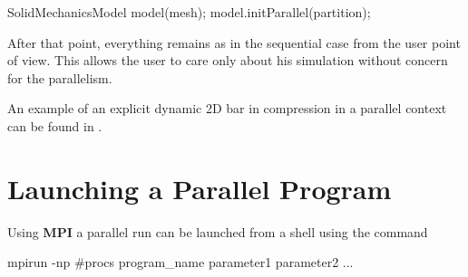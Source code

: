 \begin{cpp}
  SolidMechanicsModel model(mesh);
  model.initParallel(partition);
\end{cpp}

After that point, everything remains as in the sequential case from
the user point of view. This allows the user to care only
about his simulation without concern for the parallelism.

An example of an explicit dynamic 2D bar in compression in a parallel
context can be found in .

\section{Launching a Parallel Program}

Using \textbf{MPI} a parallel run can be launched from a shell
using the command

\begin{cpp}
  mpirun -np #procs program_name parameter1 parameter2 ...
\end{cpp}


